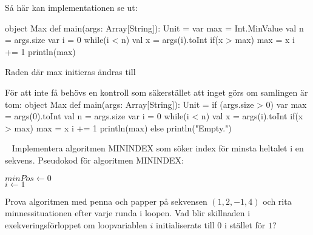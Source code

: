\SubtaskSolved  Så här kan implementationen se ut:
\begin{Code}
object Max {
  def main(args: Array[String]): Unit = {
    var max = Int.MinValue
    val n = args.size
    var i = 0
    while(i < n) {
      val x = args(i).toInt
      if(x > max)  max = x
      i += 1
    }
    println(max)
  }
}
\end{Code}

\SubtaskSolved  Raden där max initieras ändras till 

\SubtaskSolved  För att inte få  behövs en kontroll som säkerstället att inget görs om samlingen  är tom:
object Max {
  def main(args: Array[String]): Unit = if (args.size > 0) {
    var max = args(0).toInt
    val n = args.size
    var i = 0
    while(i < n) {
      val x = args(i).toInt
      if(x > max) {
        max = x
      }
      i += 1
    }
    println(max)
  } else println("Empty.")
}


\QUESTEND






\QUESTBEGIN

\Task \label{task:minindex} \what~  Implementera algoritmen MININDEX som söker index för minsta heltalet i en sekvens. Pseudokod för algoritmen MININDEX:

\begin{algorithm}[H]

 $minPos \leftarrow 0 $\\
 $i \leftarrow 1$ \\
\end{algorithm}

\Subtask Prova algoritmen med penna och papper på sekvensen $(1, 2, -1, 4)$ och rita minnessituationen efter varje runda i loopen. Vad blir skillnaden i exekveringsförloppet om loopvariablen $i$  initialiserats till $0$ i stället för $1$?

